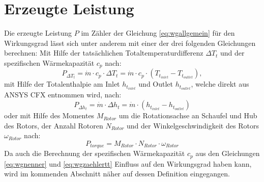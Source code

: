 \section{Erzeugte Leistung}
\label{sec:wirkungsgrade}
Die erzeugte Leistung $P$ im Zähler der Gleichung \ref{eq:wgallgemein} für den Wirkungsgrad  lässt sich unter anderem mit einer der drei folgenden Gleichungen berechnen:\newline
Mit Hilfe der tatsächlichen Totaltemperaturdifferenz $\Delta T_t$ und der spezifischen Wärmekapazität $c_p$ nach:
\begin{equation}
\label{eq:wgzaehlertt}
P_{\Delta T_t} = \dot m \cdot c_p \cdot \Delta T_t = \dot m \cdot c_p \cdot \left( T_{t_{inlet}}-T_{t_{outlet}} \right),
\end{equation}
mit Hilfe der Totalenthalpie am Inlet $h_{t_{inlet}}$ und Outlet $h_{t_{outlet}}$, welche direkt aus ANSYS CFX entnommen wird, nach:
\begin{equation}
\label{eq:wgzaehlerht}
P_{\Delta h_t} = \dot m \cdot \Delta h_t = \dot m \cdot \left( h_{t_{inlet}}-h_{t_{outlet}} \right)
\end{equation}
oder mit Hilfe des Momentes $M_{Rotor}$ um die Rotationsachse an Schaufel und Hub des Rotors, der Anzahl Rotoren $N_{Rotor}$ und der Winkelgeschwindigkeit des Rotors $\omega_{Rotor}$ nach:
\begin{equation}
\label{eq:wgzaehlertorque}
P_{torque} = M_{Rotor} \cdot N_{Rotor} \cdot \omega_{Rotor}
\end{equation}
Da auch die Berechnung der spezifischen Wärmekapazität $c_p$ aus den Gleichungen \ref{eq:wgnenner} und \ref{eq:wgzaehlertt} Einfluss auf den Wirkungsgrad haben kann, wird im kommenden Abschnitt näher auf dessen Definition eingegangen.

